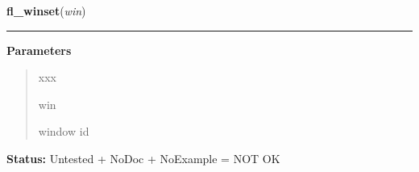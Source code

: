     \label{xformslib:library:fl_winset}

    \vspace{0.5ex}

\hspace{.8\funcindent}\begin{boxedminipage}{\funcwidth}

    \raggedright \textbf{fl\_winset}(\textit{win})

    \vspace{-1.5ex}

    \rule{\textwidth}{0.5\fboxrule}
\setlength{\parskip}{2ex}
\setlength{\parskip}{1ex}
      \textbf{Parameters}
      \vspace{-1ex}

      \begin{quote}
        \begin{Ventry}{xxx}

          \item[win]

          window id

        \end{Ventry}

      \end{quote}

\textbf{Status:} Untested + NoDoc + NoExample = NOT OK



    \end{boxedminipage}

    \label{xformslib:library:fl_winreparent}

    \vspace{0.5ex}


